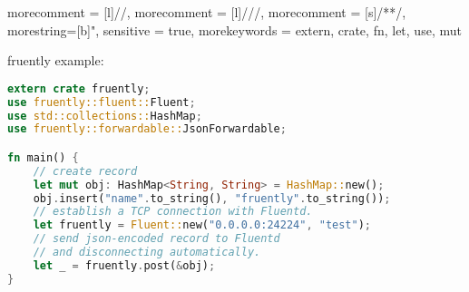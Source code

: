 \documentclass[12pt, unicode]{beamer}
\begin{document}
 {
  morecomment = [l]{//},
  morecomment = [l]{///},
  morecomment = [s]{/*}{*/},
  morestring=[b]",
  sensitive = true,
  morekeywords = {extern, crate, fn, let, use, mut}
}
\newcommand\Small{\fontsize{9}{9.2}\selectfont}
\begin{frame}[fragile]
fruently example:
\begin{lstlisting}[language={Rust},basicstyle=\ttfamily\Small]
extern crate fruently;
use fruently::fluent::Fluent;
use std::collections::HashMap;
use fruently::forwardable::JsonForwardable;

fn main() {
    // create record
    let mut obj: HashMap<String, String> = HashMap::new();
    obj.insert("name".to_string(), "fruently".to_string());
    // establish a TCP connection with Fluentd.
    let fruently = Fluent::new("0.0.0.0:24224", "test");
    // send json-encoded record to Fluentd
    // and disconnecting automatically.
    let _ = fruently.post(&obj);
}
\end{lstlisting}
\end{frame}


\end{document}
